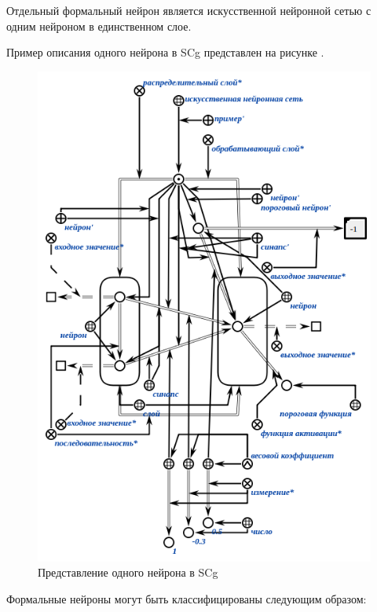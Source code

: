 Отдельный формальный нейрон является искусственной нейронной сетью с одним нейроном в единственном слое.

Пример описания одного нейрона в SCg представлен на рисунке \textit{}.

\begin{figure}[H]
	\includegraphics[scale=0.8]{author/part3/figures/neural_network_scg.png}
	\caption{Представление одного нейрона в SCg}
	\label{fig:nn_scg}
\end{figure}

Формальные нейроны могут быть классифицированы следующим образом:

